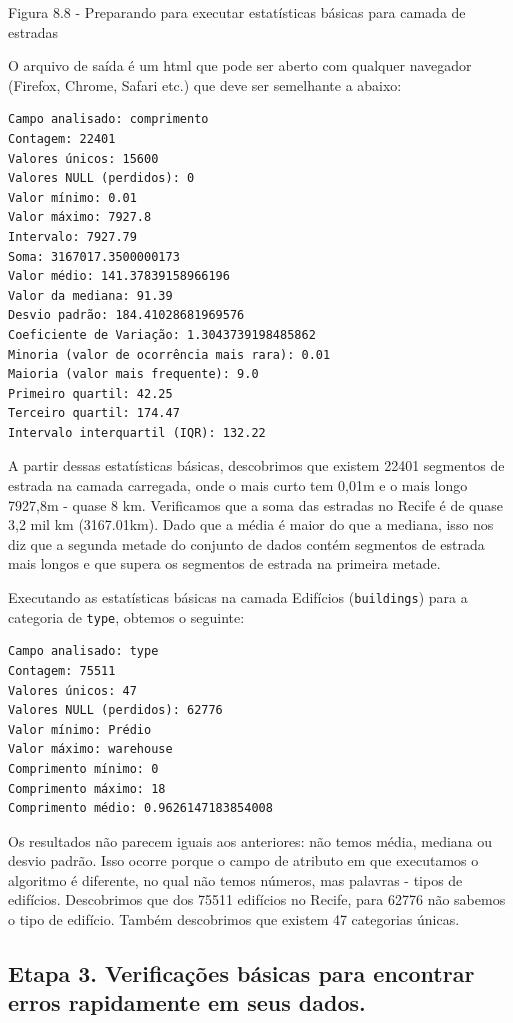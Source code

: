\documentclass[
  portuguese,
]{krantz}
\begin{document}
Figura 8.8 - Preparando para executar estatísticas básicas para camada de estradas

O arquivo de saída é um html que pode ser aberto com qualquer navegador (Firefox, Chrome, Safari etc.) que deve ser semelhante a abaixo:

\begin{verbatim}
Campo analisado: comprimento
Contagem: 22401
Valores únicos: 15600
Valores NULL (perdidos): 0
Valor mínimo: 0.01
Valor máximo: 7927.8
Intervalo: 7927.79
Soma: 3167017.3500000173
Valor médio: 141.37839158966196
Valor da mediana: 91.39
Desvio padrão: 184.41028681969576
Coeficiente de Variação: 1.3043739198485862
Minoria (valor de ocorrência mais rara): 0.01
Maioria (valor mais frequente): 9.0
Primeiro quartil: 42.25
Terceiro quartil: 174.47
Intervalo interquartil (IQR): 132.22
\end{verbatim}

A partir dessas estatísticas básicas, descobrimos que existem 22401 segmentos de estrada na camada carregada, onde o mais curto tem 0,01m e o mais longo 7927,8m - quase 8 km. Verificamos que a soma das estradas no Recife é de quase 3,2 mil km (3167.01km). Dado que a média é maior do que a mediana, isso nos diz que a segunda metade do conjunto de dados contém segmentos de estrada mais longos e que supera os segmentos de estrada na primeira metade.

Executando as estatísticas básicas na camada Edifícios (\texttt{buildings}) para a categoria de \texttt{type}, obtemos o seguinte:

\begin{verbatim}
Campo analisado: type
Contagem: 75511
Valores únicos: 47
Valores NULL (perdidos): 62776
Valor mínimo: Prédio
Valor máximo: warehouse
Comprimento mínimo: 0
Comprimento máximo: 18
Comprimento médio: 0.9626147183854008
\end{verbatim}

Os resultados não parecem iguais aos anteriores: não temos média, mediana ou desvio padrão. Isso ocorre porque o campo de atributo em que executamos o algoritmo é diferente, no qual não temos números, mas palavras - tipos de edifícios. Descobrimos que dos 75511 edifícios no Recife, para 62776 não sabemos o tipo de edifício. Também descobrimos que existem 47 categorias únicas.

\hypertarget{etapa-3.-verificauxe7uxf5es-buxe1sicas-para-encontrar-erros-rapidamente-em-seus-dados.}{%
\subsection{\texorpdfstring{\textbf{Etapa 3. Verificações básicas para encontrar erros rapidamente em seus dados.}}{Etapa 3. Verificações básicas para encontrar erros rapidamente em seus dados.}}\label{etapa-3.-verificauxe7uxf5es-buxe1sicas-para-encontrar-erros-rapidamente-em-seus-dados.}}
\end{document}
